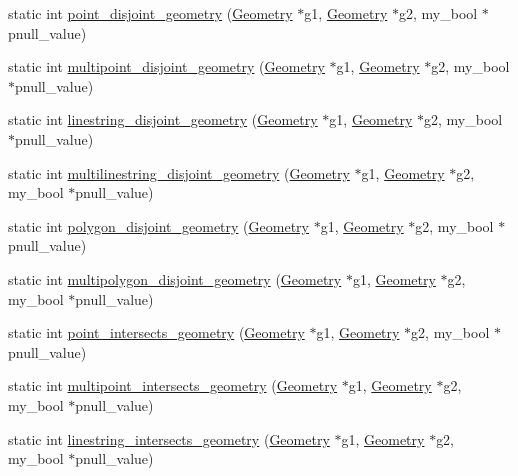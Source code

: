 \begin{DoxyCompactItemize}
\item 
static int \mbox{\hyperlink{classBG__wrap_aabaab12902ac306d661cb2b74b5e8c87}{point\+\_\+disjoint\+\_\+geometry}} (\mbox{\hyperlink{classGeometry}{Geometry}} $\ast$g1, \mbox{\hyperlink{classGeometry}{Geometry}} $\ast$g2, my\+\_\+bool $\ast$pnull\+\_\+value)
\item 
static int \mbox{\hyperlink{classBG__wrap_a062c82955f9881f2005608aa1a0658b3}{multipoint\+\_\+disjoint\+\_\+geometry}} (\mbox{\hyperlink{classGeometry}{Geometry}} $\ast$g1, \mbox{\hyperlink{classGeometry}{Geometry}} $\ast$g2, my\+\_\+bool $\ast$pnull\+\_\+value)
\item 
static int \mbox{\hyperlink{classBG__wrap_af2ca881b0d6aa742d344d8b16036bc64}{linestring\+\_\+disjoint\+\_\+geometry}} (\mbox{\hyperlink{classGeometry}{Geometry}} $\ast$g1, \mbox{\hyperlink{classGeometry}{Geometry}} $\ast$g2, my\+\_\+bool $\ast$pnull\+\_\+value)
\item 
static int \mbox{\hyperlink{classBG__wrap_aa17a1a066abf044a7666ffb193b5fcfe}{multilinestring\+\_\+disjoint\+\_\+geometry}} (\mbox{\hyperlink{classGeometry}{Geometry}} $\ast$g1, \mbox{\hyperlink{classGeometry}{Geometry}} $\ast$g2, my\+\_\+bool $\ast$pnull\+\_\+value)
\item 
static int \mbox{\hyperlink{classBG__wrap_a91432f26f57f68f94485ca78b6436d9f}{polygon\+\_\+disjoint\+\_\+geometry}} (\mbox{\hyperlink{classGeometry}{Geometry}} $\ast$g1, \mbox{\hyperlink{classGeometry}{Geometry}} $\ast$g2, my\+\_\+bool $\ast$pnull\+\_\+value)
\item 
static int \mbox{\hyperlink{classBG__wrap_a72c0a35a50031670aa278798540f85e8}{multipolygon\+\_\+disjoint\+\_\+geometry}} (\mbox{\hyperlink{classGeometry}{Geometry}} $\ast$g1, \mbox{\hyperlink{classGeometry}{Geometry}} $\ast$g2, my\+\_\+bool $\ast$pnull\+\_\+value)
\item 
static int \mbox{\hyperlink{classBG__wrap_accd52fcc8512eb736424835566bfad3e}{point\+\_\+intersects\+\_\+geometry}} (\mbox{\hyperlink{classGeometry}{Geometry}} $\ast$g1, \mbox{\hyperlink{classGeometry}{Geometry}} $\ast$g2, my\+\_\+bool $\ast$pnull\+\_\+value)
\item 
static int \mbox{\hyperlink{classBG__wrap_aef5f5956a333345fb70351625edb7bf9}{multipoint\+\_\+intersects\+\_\+geometry}} (\mbox{\hyperlink{classGeometry}{Geometry}} $\ast$g1, \mbox{\hyperlink{classGeometry}{Geometry}} $\ast$g2, my\+\_\+bool $\ast$pnull\+\_\+value)
\item 
static int \mbox{\hyperlink{classBG__wrap_ac733b7184a000958810f27c25549a7d2}{linestring\+\_\+intersects\+\_\+geometry}} (\mbox{\hyperlink{classGeometry}{Geometry}} $\ast$g1, \mbox{\hyperlink{classGeometry}{Geometry}} $\ast$g2, my\+\_\+bool $\ast$pnull\+\_\+value)

\end{DoxyCompactItemize}
